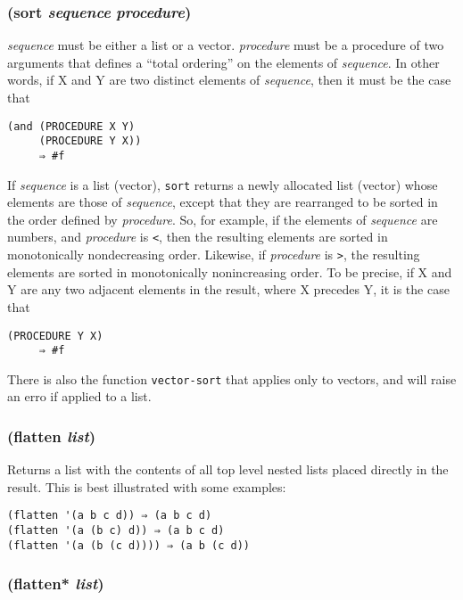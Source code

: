 \documentclass{article}
\begin{document}
\subsubsection{(sort \emph{sequence} \emph{procedure})}

\emph{sequence} must be either a list or a vector. \emph{procedure} must be a procedure of two
arguments that defines a ``total ordering'' on the elements of \emph{sequence}. In other
words, if X and Y are two distinct elements of \emph{sequence}, then it must be the case that

\begin{verbatim}
(and (PROCEDURE X Y)
     (PROCEDURE Y X))
     ⇒ #f
\end{verbatim}

If \emph{sequence} is a list (vector), \verb|sort| returns a newly allocated list (vector)
whose elements are those of \emph{sequence}, except that they are rearranged to be sorted in
the order defined by \emph{procedure}. So, for example, if the elements of \emph{sequence} are
numbers, and \emph{procedure} is \verb|<|, then the resulting elements are sorted
in monotonically nondecreasing order. Likewise, if \emph{procedure} is
\verb|>|, the resulting elements are sorted in monotonically nonincreasing
order. To be precise, if X and Y are any two adjacent elements in the result, where X precedes
Y, it is the case that

\begin{verbatim}
(PROCEDURE Y X)
     ⇒ #f
\end{verbatim}

There is also the function \verb|vector-sort| that applies only to vectors, and will raise
an erro if applied to a list.

\subsubsection{(flatten \emph{list})}

Returns a list with the contents of all top level nested lists placed directly in the result.
This is best illustrated with some examples:

\begin{verbatim}
(flatten '(a b c d)) ⇒ (a b c d)
(flatten '(a (b c) d)) ⇒ (a b c d)
(flatten '(a (b (c d)))) ⇒ (a b (c d))
\end{verbatim}

\subsubsection{(flatten* \emph{list})}
\end{document}
